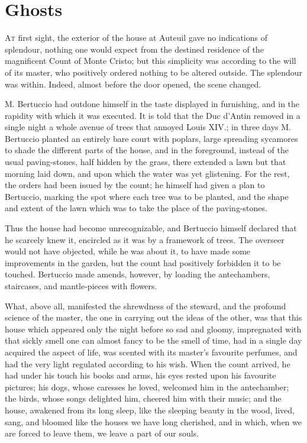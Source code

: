 \chapter{Ghosts} 

 \lettrine{A}{t} first sight, the exterior of the house at Auteuil gave no indications of splendour, nothing one would expect from the destined residence of the magnificent Count of Monte Cristo; but this simplicity was according to the will of its master, who positively ordered nothing to be altered outside. The splendour was within. Indeed, almost before the door opened, the scene changed. 

 M. Bertuccio had outdone himself in the taste displayed in furnishing, and in the rapidity with which it was executed. It is told that the Duc d'Antin removed in a single night a whole avenue of trees that annoyed Louis XIV.; in three days M. Bertuccio planted an entirely bare court with poplars, large spreading sycamores to shade the different parts of the house, and in the foreground, instead of the usual paving-stones, half hidden by the grass, there extended a lawn but that morning laid down, and upon which the water was yet glistening. For the rest, the orders had been issued by the count; he himself had given a plan to Bertuccio, marking the spot where each tree was to be planted, and the shape and extent of the lawn which was to take the place of the paving-stones. 

 Thus the house had become unrecognizable, and Bertuccio himself declared that he scarcely knew it, encircled as it was by a framework of trees. The overseer would not have objected, while he was about it, to have made some improvements in the garden, but the count had positively forbidden it to be touched. Bertuccio made amends, however, by loading the antechambers, staircases, and mantle-pieces with flowers. 

 What, above all, manifested the shrewdness of the steward, and the profound science of the master, the one in carrying out the ideas of the other, was that this house which appeared only the night before so sad and gloomy, impregnated with that sickly smell one can almost fancy to be the smell of time, had in a single day acquired the aspect of life, was scented with its master's favourite perfumes, and had the very light regulated according to his wish. When the count arrived, he had under his touch his books and arms, his eyes rested upon his favourite pictures; his dogs, whose caresses he loved, welcomed him in the antechamber; the birds, whose songs delighted him, cheered him with their music; and the house, awakened from its long sleep, like the sleeping beauty in the wood, lived, sang, and bloomed like the houses we have long cherished, and in which, when we are forced to leave them, we leave a part of our souls. 

